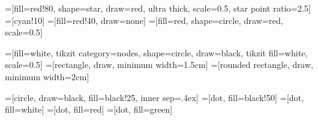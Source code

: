=[fill=red!80, shape=star, draw=red, ultra thick,
  scale=0.5, star point ratio=2.5]
=[cyan!10]
=[fill=red!40, draw=none]
=[fill=red, shape=circle, draw=red, scale=0.5]

=[fill=white, tikzit category=nodes, shape=circle,
  draw=black, tikzit fill=white, scale=0.5]
=[rectangle, draw, minimum width=1.5cm]
=[rounded rectangle, draw, minimum width=2cm]

=[circle, draw=black, fill=black!25, inner sep=.4ex]
=[dot, fill=black!50]
=[dot, fill=white]
=[dot, fill=red]
=[dot, fill=green]
